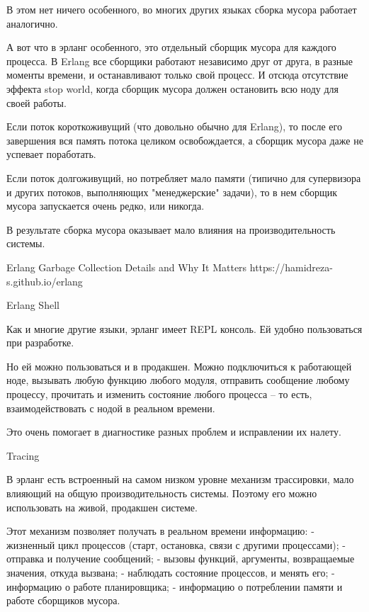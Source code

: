 \documentclass[10pt]{beamer}
\begin{document}
В этом нет ничего особенного, во многих других языках сборка мусора работает аналогично.

А вот что в эрланг особенного, это отдельный сборщик мусора для каждого процесса.
В Erlang все сборщики работают независимо друг от друга, в разные моменты времени, и останавливают только свой процесс.
И отсюда отсутствие эффекта stop world, когда сборщик мусора должен остановить всю ноду для своей работы.

Если поток короткоживущий (что довольно обычно для Erlang),
то после его завершения вся память потока целиком освобождается, а сборщик мусора даже не успевает поработать.

Если поток долгоживущий, но потребляет мало памяти (типично для супервизора и других потоков, выполняющих "менеджерские" задачи),
то в нем сборщик мусора запускается очень редко, или никогда.

В результате сборка мусора оказывает мало влияния на производительность системы.

Erlang Garbage Collection Details and Why It Matters
https://hamidreza-s.github.io/erlang%


Erlang Shell

Как и многие другие языки, эрланг имеет REPL консоль.
Ей удобно пользоваться при разработке.

Но ей можно пользоваться и в продакшен. Можно подключиться к работающей ноде,
вызывать любую функцию любого модуля, отправить сообщение любому процессу,
прочитать и изменить состояние любого процесса -- то есть,
взаимодействовать с нодой в реальном времени.

Это очень помогает в диагностике разных проблем и исправлении их налету.


Tracing

В эрланг есть встроенный на самом низком уровне механизм трассировки,
мало влияющий на общую производительность системы. Поэтому его можно
использовать на живой, продакшен системе.

Этот механизм позволяет получать в реальном времени информацию:
- жизненный цикл процессов (старт, остановка, связи с другими процессами);
- отправка и получение сообщений;
- вызовы функций, аргументы, возвращаемые значения, откуда вызвана;
- наблюдать состояние процессов, и менять его;
- информацию о работе планировщика;
- информацию о потреблении памяти и работе сборщиков мусора.
\end{document}
